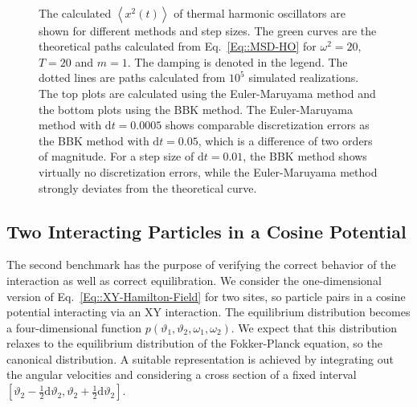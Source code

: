 	\begin{figure}[tb]
		\begin{subfigure}{0.4825\textwidth}
			\centering
			
		\end{subfigure}
		\begin{subfigure}{0.4825\textwidth}
			\centering
			
		\end{subfigure}  \\
		\begin{subfigure}{0.4825\textwidth}
			\centering
			
		\end{subfigure}
		\begin{subfigure}{0.4825\textwidth}
			\centering
			
		\end{subfigure}
		\caption{The calculated $\left \langle x^2 (t) \right \rangle $ of thermal harmonic oscillators are shown for different methods and step sizes. The green curves are the theoretical paths calculated from Eq.~\eqref{Eq::MSD-HO} for $\omega^2 =	20$, $T	=	20$ and $m=1$.	The damping is denoted in the legend. The dotted lines are paths calculated from $10^5$ simulated realizations. The top plots are calculated using the Euler-Maruyama method and the bottom plots using the BBK	method. The Euler-Maruyama method with $\text{d}t =	0.0005$ shows comparable discretization errors as the BBK method with $\text{d}t =	0.05$, which is a difference of two orders of magnitude. For a step size of $\text{d}t = 0.01$, the BBK method shows virtually no discretization errors, while the Euler-Maruyama method strongly deviates from the theoretical curve.}
		\label{Fig::MSD-Comparison}
	\end{figure}
	\subsection{Two Interacting Particles in a Cosine Potential}
	The second benchmark has the purpose of verifying the correct behavior of the interaction as well as correct equilibration. We consider the one-dimensional version of Eq.~\eqref{Eq::XY-Hamilton-Field} for two sites, so particle pairs in a cosine potential interacting via an XY interaction. The equilibrium distribution becomes a four-dimensional function $p(\vartheta_1, \vartheta_2, \omega_1, \omega_2)$. We expect that this distribution relaxes to the equilibrium distribution of the Fokker-Planck equation, so the canonical distribution. A suitable representation is achieved by integrating out the angular velocities and considering a cross section of a fixed interval $\left[\vartheta_2 - \tfrac{1}{2} \text{d} \vartheta_2, \vartheta_2 + \tfrac{1}{2} \text{d} \vartheta_2 \right]$.  \\
	
